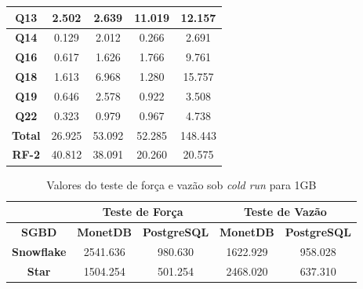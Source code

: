 \begin{table}[htpb]
\begin{tabular}{|c|c|c|c|c|}
        \hline
         \textbf{Q13}         & 2.502             & 2.639                         & 11.019            & 12.157                    \\ 
        \hline
         \textbf{Q14}         & 0.129             & 2.012                         & 0.266             & 2.691                     \\ 
        \hline
         \textbf{Q16}         & 0.617             & 1.626                         & 1.766             & 9.761                     \\ 
        \hline
         \textbf{Q18}         & 1.613             & 6.968                         & 1.280             & 15.757                    \\ 
        \hline
         \textbf{Q19}         & 0.646             & 2.578                         & 0.922             & 3.508                     \\ 
        \hline
         \textbf{Q22}         & 0.323             & 0.979                         & 0.967             & 4.738                     \\ 
        \hline
         \textbf{Total}       & 26.925            & 53.092                        & 52.285            & 148.443                   \\ 
        \hline
         \textbf{RF-2}        & 40.812            & 38.091                        & 20.260            & 20.575                    \\
        \hline
        \end{tabular}
        \end{table}


\begin{table}[htpb]
        \centering
        \caption{Valores do teste de força e vazão sob \textit{cold run} para 1GB}
        \label{tab:forca_vazao_cold_1}
        \begin{tabular}{|c|c|c|c|c|} 
        \cline{2-5}
        \multicolumn{1}{c|}{} & \multicolumn{2}{c|}{\textbf{Teste de Força} } & \multicolumn{2}{c|}{\textbf{Teste de Vazão} }  \\ 
        \hline
                \textbf{SGBD}        & \textbf{MonetDB}  & \textbf{PostgreSQL}       & \textbf{MonetDB}  & \textbf{PostgreSQL}        \\ 
        \hline
                \textbf{Snowflake}   & 2541.636          & 980.630                   & 1622.929          & 958.028                    \\ 
        \hline
                \textbf{Star}        & 1504.254          & 501.254                   & 2468.020          & 637.310                    \\
        \hline
        \end{tabular}
\end{table}

